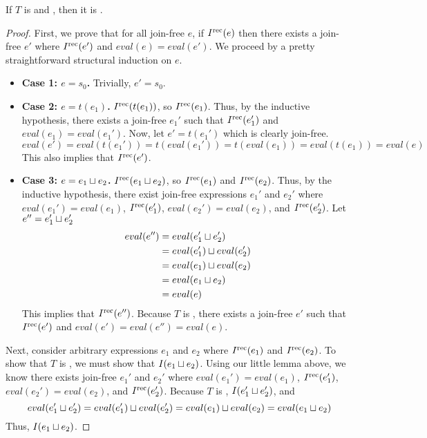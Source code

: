\begin{claim}
  If $T$ is \dIconfluent{} and \dIreducible, then it is \Iconfluent.
\end{claim}
\begin{proof}
  First, we prove that for all join-free $e$, if $I^{\text{rec}}(e)$ then there exists a
  join-free $e'$ where $I^{\text{rec}}(e')$ and $eval(e) = eval(e')$. We proceed by a
  pretty straightforward structural induction on $e$.
  \begin{itemize}
    \item \textbf{Case 1: $e = s_0$.}
      Trivially, $e' = s_0.$

    \item \textbf{Case 2: $e = t(e_1)$.}
      $I^{\text{rec}}(t(e_1))$, so $I^{\text{rec}}(e_1)$. Thus, by the inductive hypothesis,
      there exists a join-free $e_1'$ such that $I^{\text{rec}}(e_1')$ and $eval(e_1) =
      eval(e_1')$. Now, let $e' = t(e_1')$ which is clearly join-free.
      \[
        eval(e')
          = eval(t(e_1'))
          = t(eval(e_1'))
          = t(eval(e_1))
          = eval(t(e_1))
          = eval(e)
      \]
      This also implies that $I^{\text{rec}}(e')$.

    \item \textbf{Case 3: $e = e_1 \sqcup e_2$.}
      $I^{\text{rec}}(e_1 \sqcup e_2)$, so $I^{\text{rec}}(e_1)$ and $I^{\text{rec}}(e_2)$. Thus, by the
      inductive hypothesis, there exist join-free expressions $e_1'$ and $e_2'$
      where $eval(e_1') = eval(e_1)$, $I^{\text{rec}}(e_1')$, $eval(e_2') = eval(e_2)$,
      and $I^{\text{rec}}(e_2')$. Let $e'' = e_1' \sqcup e_2'$
      \begin{align*}
        eval(e'')
        &= eval(e_1' \sqcup e_2') \\
        &= eval(e_1') \sqcup eval(e_2') \\
        &= eval(e_1) \sqcup eval(e_2) \\
        &= eval(e_1 \sqcup e_2) \\
        &= eval(e)
      \end{align*}
      This implies that $I^{\text{rec}}(e'')$. Because $T$ is \dIreducible, there exists
      a join-free $e'$ such that $I^{\text{rec}}(e')$ and $eval(e') = eval(e'') =
      eval(e)$.
  \end{itemize}

  Next, consider arbitrary expressions $e_1$ and $e_2$ where $I^{\text{rec}}(e_1)$ and
  $I^{\text{rec}}(e_2)$. To show that $T$ is \Iconfluent, we must show that $I(e_1 \sqcup
  e_2)$. Using our little lemma above, we know there exists join-free $e_1'$
  and $e_2'$ where $eval(e_1') = eval(e_1)$, $I^{\text{rec}}(e_1')$, $eval(e_2') =
  eval(e_2)$, and $I^{\text{rec}}(e_2')$. Because $T$ is \dIconfluent, $I(e_1' \sqcup e_2')$, and
  \[
    eval(e_1' \sqcup e_2')
      = eval(e_1') \sqcup eval(e_2')
      = eval(e_1) \sqcup eval(e_2)
      = eval(e_1 \sqcup e_2)
  \]
  Thus, $I(e_1 \sqcup e_2)$.
\end{proof}
